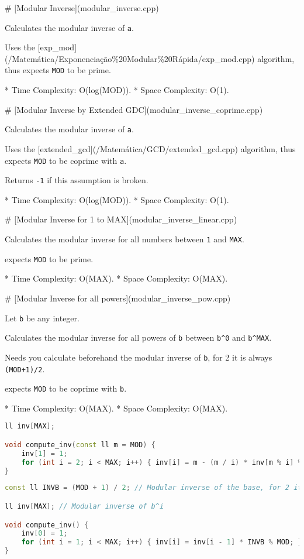 \documentclass[11pt, a4paper, twoside]{article}
\begin{document}
\# [Modular Inverse](modular\_inverse.cpp)

Calculates the modular inverse of \lstinline{a}.

Uses the [exp\_mod](/Matemática/Exponenciação\%20Modular\%20Rápida/exp\_mod.cpp) algorithm, thus expects \lstinline{MOD} to be prime.

* Time Complexity: O(log(MOD)).
* Space Complexity: O(1).

\# [Modular Inverse by Extended GDC](modular\_inverse\_coprime.cpp)

Calculates the modular inverse of \lstinline{a}.

Uses the [extended\_gcd](/Matemática/GCD/extended\_gcd.cpp) algorithm, thus expects \lstinline{MOD} to be coprime with \lstinline{a}.

Returns \lstinline{-1} if this assumption is broken.

* Time Complexity: O(log(MOD)).
* Space Complexity: O(1).

\# [Modular Inverse for 1 to MAX](modular\_inverse\_linear.cpp)

Calculates the modular inverse for all numbers between \lstinline{1} and \lstinline{MAX}.

expects \lstinline{MOD} to be prime.

* Time Complexity: O(MAX).
* Space Complexity: O(MAX).

\# [Modular Inverse for all powers](modular\_inverse\_pow.cpp)

Let \lstinline{b} be any integer.

Calculates the modular inverse for all powers of \lstinline{b} between \lstinline{b^0} and \lstinline{b^MAX}.

Needs you calculate beforehand the modular inverse of \lstinline{b}, for 2 it is always \lstinline{(MOD+1)/2}.

expects \lstinline{MOD} to be coprime with \lstinline{b}.

* Time Complexity: O(MAX).
* Space Complexity: O(MAX).

\begin{lstlisting}[language=C++]
ll inv[MAX];

void compute_inv(const ll m = MOD) {
    inv[1] = 1;
    for (int i = 2; i < MAX; i++) { inv[i] = m - (m / i) * inv[m % i] % m; }
}
\end{lstlisting}

\begin{lstlisting}[language=C++]
const ll INVB = (MOD + 1) / 2; // Modular inverse of the base, for 2 it is (MOD+1)/2

ll inv[MAX]; // Modular inverse of b^i

void compute_inv() {
    inv[0] = 1;
    for (int i = 1; i < MAX; i++) { inv[i] = inv[i - 1] * INVB % MOD; }
}
\end{lstlisting}
\end{document}
